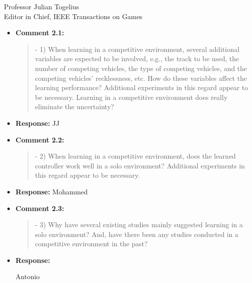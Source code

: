 \documentclass[10pt]{letter} %
\begin{document}
\begin{letter}{Professor Julian Togelius \\ Editor in Chief, IEEE Transactions on Games}
\begin{enumerate}
\begin{itemize}
		\item {\bf Comment 2.1:}				
		\begin{quote}
- 1) When learning in a competitive environment, several additional variables are expected to be involved, e.g., the track to be used, the number of competing vehicles, the type of competing vehicles, and the competing vehicles' recklessness, etc. How do these variables affect the learning performance? Additional experiments in this regard appear to be necessary. Learning in a competitive environment does really eliminate the uncertainty?
			\end{quote}	
			\item {\bf Response:} 
			JJ
		\item {\bf Comment 2.2:}
		\begin{quote}
- 2) When learning in a competitive environment, does the learned controller work well in a solo environment? Additional experiments in this regard appear to be necessary.
			\end{quote}	
		\item {\bf Response:} 
		Mohammed
		\item {\bf Comment 2.3:}
		\begin{quote}
- 3) Why have several existing studies mainly suggested learning in a solo environment? And, have there been any studies conducted in a competitive environment in the past?
			\end{quote}	
		\item {\bf Response:} 
		
		Antonio
		

\end{itemize}
\end{enumerate}
\end{letter}
\end{document}
